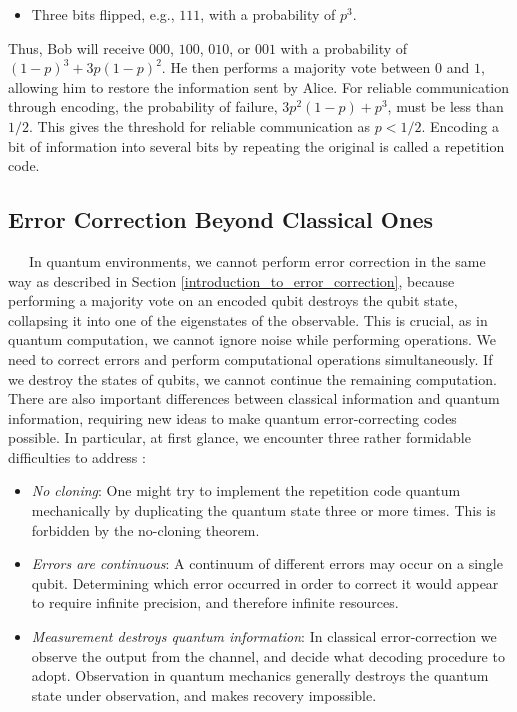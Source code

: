 \documentclass[a4paper,11pt]{ltjsarticle}
\begin{document}
{{\begin{itemize}
            \item Three bits flipped, e.g., $111$, with a probability of $p^3$.
        \end{itemize}
        Thus, Bob will receive $000$, $100$, $010$, or $001$ with a probability of $(1-p)^3 + 3p(1-p)^2$. He then performs a majority vote between $0$ and $1$, allowing him to restore the information sent by Alice. For reliable communication through encoding, the probability of failure, $3p^2(1-p) + p^3$, must be less than $1/2$. This gives the threshold for reliable communication as $p < 1/2$. Encoding a bit of information into several bits by repeating the original is called a repetition code.

        \subsection{Error Correction Beyond Classical Ones}\label{repetition_code}{
            \ \ \ In quantum environments, we cannot perform error correction in the same way as described in Section \ref{introduction_to_error_correction}, because performing a majority vote on an encoded qubit destroys the qubit state, collapsing it into one of the eigenstates of the observable. This is crucial, as in quantum computation, we cannot ignore noise while performing operations. We need to correct errors and perform computational operations simultaneously. If we destroy the states of qubits, we cannot continue the remaining computation. There are also important differences between classical information and quantum information, requiring new ideas to make quantum error-correcting codes possible. In particular, at first glance, we encounter three rather formidable difficulties to address \cite{nielsen2010}:

            \begin{itemize}
                \item \textit{No cloning}: One might try to implement the repetition code quantum mechanically by duplicating the quantum state three or more times. This is forbidden by the no-cloning theorem.
                \item \textit{Errors are continuous}: A continuum of different errors may occur on a single qubit.
                Determining which error occurred in order to correct it would appear to require infinite precision, and therefore infinite resources.
                \item \textit{Measurement destroys quantum information}: In classical error-correction we observe the output from the channel, and decide what decoding procedure to adopt. Observation in quantum mechanics generally destroys the quantum state under observation, and makes recovery impossible.
            \end{itemize}

}}}
\end{document}
